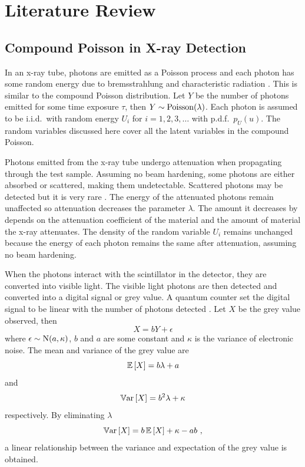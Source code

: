 \section{Literature Review}

\subsection{Compound Poisson in X-ray Detection}

In an x-ray tube, photons are emitted as a Poisson process \citep{whiting2006properties, cierniak2011x} and each photon has some random energy due to bremsstrahlung and characteristic radiation \citep{sun2012overview}. This is similar to the compound Poisson distribution. Let $Y$ be the number of photons emitted for some time exposure $\tau$, then $Y\sim\operatorname{Poisson}(\lambda)$. Each photon is assumed to be i.i.d.~with random energy $U_i$ for $i=1,2,3,\dotsc$ with p.d.f.~$p_U(u)$. The random variables discussed here cover all the latent variables in the compound Poisson.

Photons emitted from the x-ray tube undergo attenuation when propagating through the test sample. Assuming no beam hardening, some photons are either absorbed or scattered, making them undetectable. Scattered photons may be detected but it is very rare \citep{cantatore2011introduction}. The energy of the attenuated photons remain unaffected so attenuation decreases the parameter $\lambda$. The amount it decreases by depends on the attenuation coefficient of the material and the amount of material the x-ray attenuates. The density of the random variable $U_i$ remains unchanged because the energy of each photon remains the same after attenuation, assuming no beam hardening.

When the photons interact with the scintillator in the detector, they are converted into visible light. The visible light photons are then detected and converted into a digital signal or grey value. A quantum counter set the digital signal to be linear with the number of photons detected \citep{whiting2006properties}. Let $X$ be the grey value observed, then
\begin{equation}
X = bY + \epsilon
\end{equation}
where $\epsilon\sim\operatorname{N}(a,\kappa)$, $b$ and $a$ are some constant and $\kappa$ is the variance of electronic noise. The mean and variance of the grey value are
\begin{equation}
\operatorname{\mathbb{E}}\left[X\right] = b\lambda + a
\end{equation}
and
\begin{equation}
\operatorname{\mathbb{V}ar}\left[X\right] = b^2\lambda + \kappa
\end{equation}
respectively. By eliminating $\lambda$
\begin{equation}
\operatorname{\mathbb{V}ar}\left[X\right] = b\operatorname{\mathbb{E}}\left[X\right]+\kappa-ab \ ,
\end{equation}
a linear relationship between the variance and expectation of the grey value \citep{ma2012varaince} is obtained.

